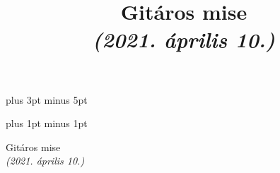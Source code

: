 \documentclass[a5paper,twoside]{article}
\title{Gitáros mise\\\textit{(2021. április 10.)}}
\date{}
\renewcommand{\_}[1]{\underline{#1}} %
\begin{document}


  \versesep=12pt plus 3pt minus 5pt

  \iflyric
    \baselineadj=2pt plus 1pt minus 1pt
  \fi

  \begin{center}
    {\huge Gitáros mise} \\
    \vspace{0.1cm}
    {\Large \textit{(2021. április 10.)}}
  \end{center}
  \vspace{-0.25cm}


  \begin{songs}{}
    
    

    

    

    

    
  \end{songs}
\end{document}
